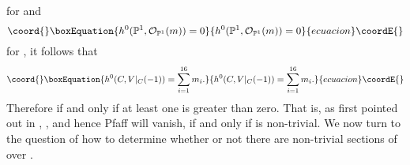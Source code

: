 \documentclass[a4paper,12pt]{article}
\numberwithin{equation}{section}
\theoremstyle{plain}
\begin{document}
%
for \coordHE{} and
%
\begin{equation}\coord{}\boxEquation{
h^{0}({\mathbb P}^1, {\cal O}_{{\mathbb P}^1} (m)) = 0
\label{beta}
}{
h^{0}({\mathbb P}^1, {\cal O}_{{\mathbb P}^1} (m)) = 0
}{ecuacion}\coordE{}\end{equation}
%
for \coordHE{}, it follows that
%
\begin{equation}\coord{}\boxEquation{
h^{0} (C, V|_{C} (-1))= \sum_{i=1}^{16} m_i.
\label{32}
}{
h^{0} (C, V|_{C} (-1))= \sum_{i=1}^{16} m_i.
}{ecuacion}\coordE{}\end{equation}
%
Therefore  \coordHE{} if and only if at least one \coordHE{}
is greater than zero. That is, as first pointed out in
\cite{Witten2},
\coordHE{}, and hence Pfaff\coordHE{} will vanish,
if and only if \coordHE{} is non-trivial.
We now turn to the question of how to determine whether or not there are
non-trivial sections of \coordHE{} over \coordHE{}.
\end{document}
